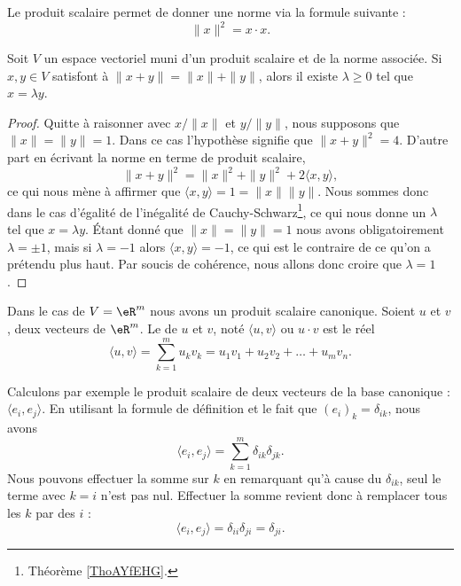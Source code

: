 Le produit scalaire permet de donner une norme via la formule suivante :
\begin{equation}
    \| x \|^2=x\cdot x.
\end{equation}

\begin{lemma}   \label{LemLPOHUme}
    Soit \( V\) un espace vectoriel muni d'un produit scalaire et de la norme associée. Si \( x,y\in V\) satisfont à \( \| x+y \|=\| x \|+\| y \|\), alors il existe \( \lambda\geq 0\) tel que \( x=\lambda y\).
\end{lemma}

\begin{proof}
    Quitte à raisonner avec \( x/\| x \|\) et \( y/\| y \|\), nous supposons que \( \| x \|=\| y \|=1\). Dans ce cas l'hypothèse signifie que \( \| x+y \|^2=4\). D'autre part en écrivant la norme en terme de produit scalaire,
    \begin{equation}
        \| x+y \|^2=\| x \|^2+\| y \|^2+2\langle x, y\rangle ,
    \end{equation}
    ce qui nous mène à affirmer que \( \langle x, y\rangle =1=\| x \|\| y \|\). Nous sommes donc dans le cas d'égalité de l'inégalité de Cauchy-Schwarz\footnote{Théorème \ref{ThoAYfEHG}.}, ce qui nous donne un \( \lambda\) tel que \( x=\lambda y\). Étant donné que \( \| x \|=\| y \|=1\) nous avons obligatoirement \( \lambda=\pm 1\), mais si \( \lambda=-1\) alors \( \langle x, y\rangle =-1\), ce qui est le contraire de ce qu'on a prétendu plus haut. Par soucis de cohérence, nous allons donc croire que \( \lambda=1\).
\end{proof}

\begin{definition}      \label{DefYNWUFc}
    Dans le cas de \( V=\eR^m\) nous avons un produit scalaire canonique. Soient $u$ et $v$, deux vecteurs de $\eR^m$. Le  de $u$ et $v$, noté $\langle u, v\rangle $ ou $u\cdot v$ est le réel
	\begin{equation}		\label{EqDefProdScalsumii}
		\langle u, v\rangle =\sum_{k=1}^m u_kv_k=u_1v_1+u_2v_2+\ldots+u_mv_n.
	\end{equation}
\end{definition}

Calculons par exemple le produit scalaire de deux vecteurs de la base canonique : $\langle e_i, e_j\rangle $. En utilisant la formule de définition et le fait que $(e_i)_k=\delta_{ik}$, nous avons
\begin{equation}
	\langle e_i, e_j\rangle =\sum_{k=1}^m\delta_{ik}\delta_{jk}.
\end{equation}
Nous pouvons effectuer la somme sur $k$ en remarquant qu'à cause du $\delta_{ik}$, seul le terme avec $k=i$ n'est pas nul. Effectuer la somme revient donc à remplacer tous les $k$ par des $i$ :
\begin{equation}
	\langle e_i, e_j\rangle =\delta_{ii}\delta_{ji}=\delta_{ji}.
\end{equation}

